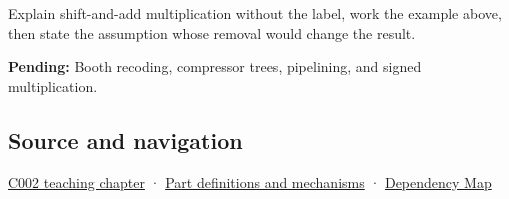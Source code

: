Explain shift-and-add multiplication without the label, work the example above, then state the assumption whose removal would change the result.

\textbf{Pending:} Booth recoding, compressor trees, pipelining, and signed multiplication.

\subsection{Source and navigation}\label{appendix-a65290d66ed9-source-and-navigation}

\hyperref[01-foundations-i-ch001-arithmetic-becomes-a-policy]{C002 teaching chapter} · \hyperref[appendix-fd090d982a15]{Part definitions and mechanisms} · \hyperref[appendix-4ad47bdd269a]{Dependency Map}
